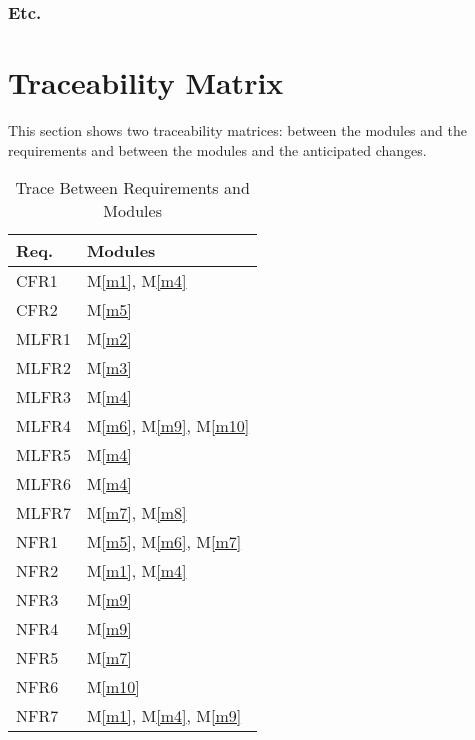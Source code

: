 \documentclass[12pt, titlepage]{article}
\newcommand{\mref}[1]{M\ref{#1}}
\begin{document}
\subsubsection{Etc.}

\section{Traceability Matrix} \label{SecTM}

This section shows two traceability matrices: between the modules and the
requirements and between the modules and the anticipated changes.

\begin{table}[H]
\centering
\begin{tabular}{p{} p{}}
\toprule
\textbf{Req.} & \textbf{Modules}\\
\midrule
CFR1 & \mref{m1}, \mref{m4}\\
CFR2 & \mref{m5}\\
MLFR1 & \mref{m2}\\
MLFR2 & \mref{m3}\\
MLFR3 & \mref{m4}\\
MLFR4 & \mref{m6}, \mref{m9}, \mref{m10}\\
MLFR5 & \mref{m4}\\
MLFR6 & \mref{m4}\\
MLFR7 & \mref{m7}, \mref{m8}\\
NFR1 & \mref{m5}, \mref{m6}, \mref{m7}\\
NFR2 & \mref{m1}, \mref{m4}\\
NFR3 & \mref{m9}\\
NFR4 & \mref{m9}\\
NFR5 & \mref{m7}\\
NFR6 & \mref{m10}\\
NFR7 & \mref{m1}, \mref{m4}, \mref{m9}\\

\bottomrule
\end{tabular}
\caption{Trace Between Requirements and Modules}
\label{TblRT}
\end{table}
\end{document}
